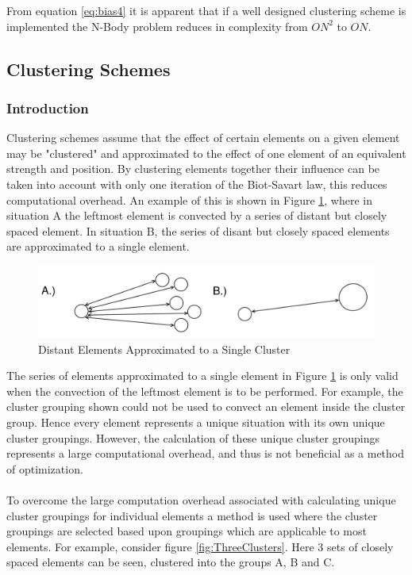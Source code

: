 From equation \ref{eq:bias4} it is apparent that if a well designed clustering scheme is implemented the N-Body problem reduces in complexity from $ON^2$ to $ON$.

\subsection{Clustering Schemes}
\subsubsection{Introduction}
Clustering schemes assume that the effect of certain elements on a given element may be "clustered" and approximated to the effect of one element of an equivalent strength and position. By clustering elements together their influence can be taken into account with only one iteration of the Biot-Savart law, this reduces computational overhead. An example of this is shown in Figure \ref{fig:StoC}, where in situation A the leftmost element is convected by a series of distant but closely spaced element. In situation B, the  series of disant but closely spaced elements are approximated to a single element.

\begin{figure}[H]
\includegraphics[width=1.0\textwidth]{Figures/SeriesToCluster.png}
\caption{\label{fig:StoC}Distant Elements Approximated to a Single Cluster}
\end{figure}

The series of elements approximated to a single element in Figure \ref{fig:StoC} is only valid when the convection of the leftmost element is to be performed. For example, the cluster grouping shown could not be used to convect an element inside the cluster group. Hence every element represents a unique situation with its own unique cluster groupings. However, the calculation of these unique cluster groupings represents a large computational overhead, and thus is not beneficial as a method of optimization.
\\\\
To overcome the large computation overhead associated with calculating unique cluster groupings for individual elements a method is used where the cluster groupings are selected based upon groupings which are applicable to most elements. For example, consider figure \ref{fig:ThreeClusters}. Here 3 sets of closely spaced elements can be seen, clustered into the groups A, B and C.

